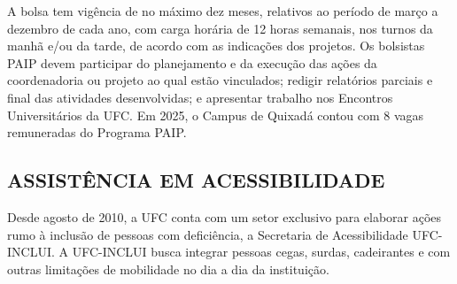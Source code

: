 
A bolsa tem vigência de no máximo dez meses, relativos ao período de março a dezembro de cada ano, com carga horária de 12 horas semanais, nos turnos da manhã e/ou da tarde, de acordo com as indicações dos projetos. Os bolsistas PAIP devem participar do planejamento e da execução das ações da coordenadoria ou projeto ao qual estão vinculados; redigir relatórios parciais e final das atividades desenvolvidas; e apresentar trabalho nos Encontros Universitários da UFC. Em 2025, o Campus de Quixadá contou com 8 vagas remuneradas do Programa PAIP. 




\subsection{ASSISTÊNCIA EM ACESSIBILIDADE} 
\label{sec:AssistenciaEmAcessibilidade}


Desde agosto de 2010, a UFC conta com um setor exclusivo para elaborar ações rumo à inclusão de pessoas com deficiência, a Secretaria de Acessibilidade UFC-INCLUI. A UFC-INCLUI busca integrar pessoas cegas, surdas, cadeirantes e com outras limitações de mobilidade no dia a dia da instituição.


